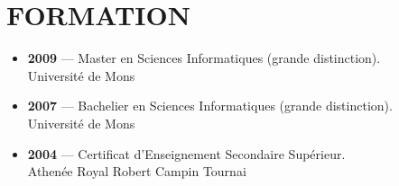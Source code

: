 \section{FORMATION}

\vspace{0.75cm}

\begin{itemize}
  \item \textbf{2009} — Master en Sciences Informatiques (grande distinction).\\Université de Mons\vspace{0.25cm}
  \item \textbf{2007} — Bachelier en Sciences Informatiques (grande distinction).\\Université de Mons\vspace{0.25cm}
  \item \textbf{2004} — Certificat d'Enseignement Secondaire Supérieur.\\Athenée Royal Robert Campin Tournai
\end{itemize}
